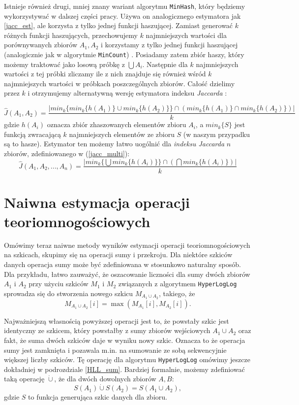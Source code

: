 Istnieje również drugi, mniej znany wariant algorytmu \texttt{MinHash}, który będziemy wykorzystywać w dalszej części pracy.
 Używa on analogicznego estymatora jak \ref{jacc_est}, ale korzysta z tylko jednej funkcji haszującej. Zamiast generować $k$ różnych funkcji haszujących, przechowujemy $k$ najmniejszych wartości dla porównywanych zbiorów $A_1, A_2$ i korzystamy z tylko jednej funkcji haszującej (analogicznie jak w algorytmie \texttt{MinCount}) \cite{adroll}. Posiadamy zatem zbiór haszy, który możemy traktować jako losową próbkę z $\bigcup A_i$. Następnie dla $k$ najmniejszych wartości z tej próbki zliczamy ile z nich znajduje się również wśród $k$ najmniejszych wartości w próbkach poszczególnych zbiorów. Całość dzielimy przez $k$ i otrzymujemy alternatywną wersję estymatora indeksu \textit{Jaccarda} \cite{adroll}:

 \begin{equation}
 \hat{J}(A_1, A_2) = \frac{|min_{k}\{min_{k} \{ h(A_1) \} \cup min_{k} \{ h(A_2) \} \} \cap (min_{k}\{h(A_1)\} \cap min_{k}\{h(A_2)\})|}{k}
 \end{equation}
 gdzie $h(A_i)$ oznacza zbiór zhaszowanych elementów zbioru $A_i$, a $min_{k}\{S\}$ jest funkcją zwracającą $k$ najmniejszych elementów ze zbioru $S$ (w naszym przypadku są to hasze).
 Estymator ten możemy łatwo uogólnić dla \textit{indeksu Jaccarda} $n$ zbiorów, zdefiniowanego w (\ref{jacc_multi}):
\begin{equation}
    \hat{J}(A_1, A_2, ..., A_n) = \frac{|min_{k}\{\bigcup min_{k} \{ h(A_i) \} \} \cap (\bigcap min_{k}\{h(A_i)\})|}{k}
\end{equation}

\section{Naiwna estymacja operacji teoriomnogościowych}
\label{naive_est}

Omówimy teraz naiwne metody wyników estymacji operacji teoriomnogościowych na szkicach, skupimy się na operacji sumy i przekroju. Dla niektóre szkiców danych operacja sumy może być zdefiniowana w stosunkowo naturalny sposób. Dla przykładu, łatwo zauważyć, że  oszacowanie liczności dla sumy dwóch zbiorów $A_1$ i $A_2$ przy użyciu szkiców $M_1$ i $M_2$ związanych z algorytmem \texttt{HyperLogLog} sprowadza się do stworzenia nowego szkicu $M_{A_1\cup A_2}$, takiego, że 
$$M_{A_1\cup A_2}[i] = \max(M_{A_1}[i], M_{A_2}[i]).$$ 

Najważniejszą własnością powyższej operacji jest to, że powstały szkic jest identyczny ze szkicem, który powstałby z sumy zbiorów wejściowych $A_1\cup A_2$ oraz fakt, że suma dwóch szkiców daje w wyniku nowy szkic. Oznacza to że operacja sumy jest zamknięta i pozawala m.in. na sumowanie ze sobą sekwencyjnie większej liczby szkiców. Tę operację dla algorytmu \texttt{HyperLogLog} omówimy jeszcze dokładniej w podrozdziale \ref{HLL_sum}.
Bardziej formalnie, możemy zdefiniować taką operację $\dot{\cup}$, że dla dwóch dowolnych zbiorów $A, B$:
\begin{equation}
    S(A_1) \dot{\cup} S(A_2) = S(A_1 \cup A_2),
\end{equation}
gdzie $S$ to funkcja generująca szkic danych dla zbioru.

